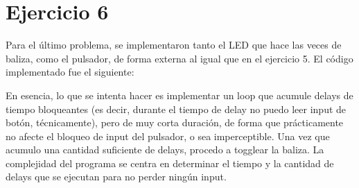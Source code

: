 \documentclass[micros_g1_main.tex]{subfiles}
\begin{document}
\section{Ejercicio 6}
Para el último problema, se implementaron tanto el LED que hace las veces de baliza, como el pulsador, de forma externa al igual que en el ejercicio 5. El código implementado fue el siguiente:

En esencia, lo que se intenta hacer es implementar un loop que acumule delays de tiempo bloqueantes (es decir, durante el tiempo de delay no puedo leer input de botón, técnicamente), pero de muy corta duración, de forma que prácticamente no afecte el bloqueo de input del pulsador, o sea imperceptible. Una vez que acumulo una cantidad suficiente de delays, procedo a togglear la baliza. 
La complejidad del programa se centra en determinar el tiempo y la cantidad de delays que se ejecutan para no perder ningún input.
\end{document}
